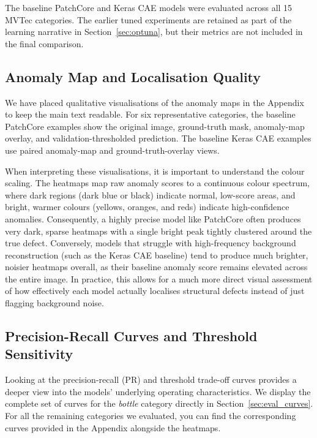\documentclass[11pt, a4paper]{article}
\begin{document}
The baseline PatchCore and Keras CAE models were evaluated across all 15 MVTec categories. The earlier tuned experiments are retained as part of the learning narrative in Section~\ref{sec:optuna}, but their metrics are not included in the final comparison.

\subsection{Anomaly Map and Localisation Quality}

We have placed qualitative visualisations of the anomaly maps in the Appendix to keep the main text readable. For six representative categories, the baseline PatchCore examples show the original image, ground-truth mask, anomaly-map overlay, and validation-thresholded prediction. The baseline Keras CAE examples use paired anomaly-map and ground-truth-overlay views.

When interpreting these visualisations, it is important to understand the colour scaling. The heatmaps map raw anomaly scores to a continuous colour spectrum, where dark regions (dark blue or black) indicate normal, low-score areas, and bright, warmer colours (yellows, oranges, and reds) indicate high-confidence anomalies. Consequently, a highly precise model like PatchCore often produces very dark, sparse heatmaps with a single bright peak tightly clustered around the true defect. Conversely, models that struggle with high-frequency background reconstruction (such as the Keras CAE baseline) tend to produce much brighter, noisier heatmaps overall, as their baseline anomaly score remains elevated across the entire image. In practice, this allows for a much more direct visual assessment of how effectively each model actually localises structural defects instead of just flagging background noise.

\subsection{Precision-Recall Curves and Threshold Sensitivity}

Looking at the precision-recall (PR) and threshold trade-off curves provides a deeper view into the models' underlying operating characteristics. We display the complete set of curves for the \textit{bottle} category directly in Section~\ref{sec:eval_curves}. For all the remaining categories we evaluated, you can find the corresponding curves provided in the Appendix alongside the heatmaps.
\end{document}
